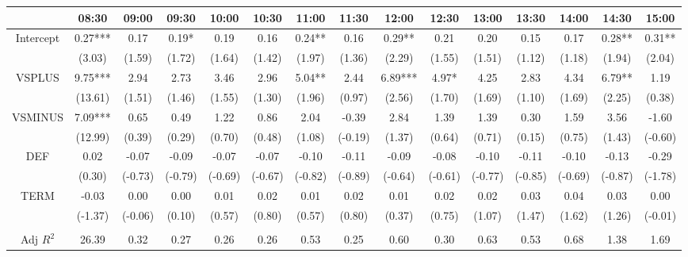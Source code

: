 \begin{table}[h]
\begin{threeparttable}
\begin{tabular}{ccccccccccccccc}
                & 08:30   & 09:00   & 09:30   & 10:00   & 10:30   & 11:00   & 11:30   & 12:00   & 12:30   & 13:00   & 13:30   & 14:00   & 14:30   & 15:00   \\ \midrule
Intercept       & 0.27*** & 0.17    & 0.19*   & 0.19    & 0.16    & 0.24**  & 0.16    & 0.29**  & 0.21    & 0.20    & 0.15    & 0.17    & 0.28**  & 0.31**  \\
                & (3.03)  & (1.59)  & (1.72)  & (1.64)  & (1.42)  & (1.97)  & (1.36)  & (2.29)  & (1.55)  & (1.51)  & (1.12)  & (1.18)  & (1.94)  & (2.04)  \\
VSPLUS          & 9.75*** & 2.94    & 2.73    & 3.46    & 2.96    & 5.04**  & 2.44    & 6.89*** & 4.97*   & 4.25    & 2.83    & 4.34    & 6.79**  & 1.19    \\
                & (13.61) & (1.51)  & (1.46)  & (1.55)  & (1.30)  & (1.96)  & (0.97)  & (2.56)  & (1.70)  & (1.69)  & (1.10)  & (1.69)  & (2.25)  & (0.38)  \\
VSMINUS         & 7.09*** & 0.65    & 0.49    & 1.22    & 0.86    & 2.04    & -0.39   & 2.84    & 1.39    & 1.39    & 0.30    & 1.59    & 3.56    & -1.60   \\
                & (12.99) & (0.39)  & (0.29)  & (0.70)  & (0.48)  & (1.08)  & (-0.19) & (1.37)  & (0.64)  & (0.71)  & (0.15)  & (0.75)  & (1.43)  & (-0.60) \\
DEF             & 0.02    & -0.07   & -0.09   & -0.07   & -0.07   & -0.10   & -0.11   & -0.09   & -0.08   & -0.10   & -0.11   & -0.10   & -0.13   & -0.29   \\
                & (0.30)  & (-0.73) & (-0.79) & (-0.69) & (-0.67) & (-0.82) & (-0.89) & (-0.64) & (-0.61) & (-0.77) & (-0.85) & (-0.69) & (-0.87) & (-1.78) \\
TERM            & -0.03   & 0.00    & 0.00    & 0.01    & 0.02    & 0.01    & 0.02    & 0.01    & 0.02    & 0.02    & 0.03    & 0.04    & 0.03    & 0.00    \\
                & (-1.37) & (-0.06) & (0.10)  & (0.57)  & (0.80)  & (0.57)  & (0.80)  & (0.37)  & (0.75)  & (1.07)  & (1.47)  & (1.62)  & (1.26)  & (-0.01) \\
                &         &         &         &         &         &         &         &         &         &         &         &         &         &         \\
Adj $R^{2}$ & 26.39   & 0.32    & 0.27    & 0.26    & 0.26    & 0.53    & 0.25    & 0.60    & 0.30    & 0.63    & 0.53    & 0.68    & 1.38    & 1.69   \\


\end{tabular}
\end{threeparttable}
\end{table}
